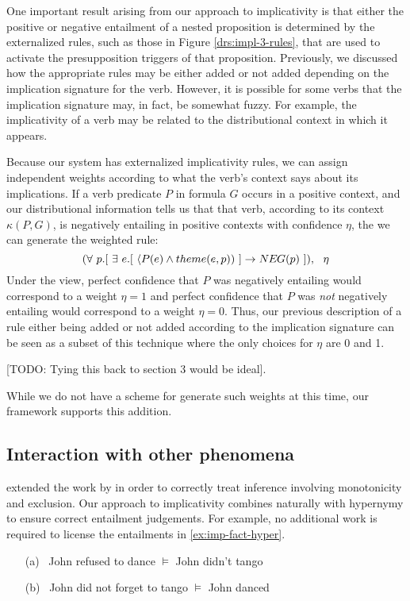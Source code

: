 One important result arising from our approach to implicativity is that
either the positive or negative entailment of a nested proposition is determined
by the externalized rules, such as those in Figure \ref{drs:impl-3-rules}, that
are used to activate the presupposition triggers of that proposition. 
Previously, we discussed how the appropriate rules may be either added or not
added depending on the implication signature for the verb.  However, it is
possible for some verbs that the implication signature may, in fact, be somewhat
fuzzy.  For example, the implicativity of a verb may be related to the
distributional context in which it appears.  

Because our system has externalized implicativity rules, we can assign
independent weights according to what the verb's context says about its
implications.  If a verb predicate $P$ in formula $G$ occurs in a positive
context, and our distributional information tells us that that verb, according
to its context $\kappa(P,G)$, is negatively entailing in positive contexts with
confidence $\eta$, the we can generate the weighted rule:
\[ (\forall~ p.[~ \exists~ e.[~ \langle P(e) \land theme(e,p)) ~] \to \NEG{p}
~]),~~\eta \]
Under the view, perfect confidence that  $P$ was negatively entailing would
correspond to a weight $\eta=1$ and perfect confidence that $P$ was {\it not}
negatively entailing would correspond to a weight $\eta=0$.  Thus, our previous
description of a rule either being added or not added according to the
implication signature can be seen as a subset of this technique where the only
choices for $\eta$ are 0 and 1.

[TODO: Tying this back to section 3 would be ideal].

While we do not have a scheme for generate such weights at this time, our
framework supports this addition.


\subsection*{Interaction with other phenomena}


\citet{maccartney:iwcs2009} extended the work by \citet{nairn:icos2006} in order
to correctly treat inference involving monotonicity and exclusion.
Our approach to implicativity combines naturally with hypernymy to ensure
correct entailment judgements. For example, no additional work is required to
license the entailments in \eqref{ex:imp-fact-hyper}.
\begin{covex}\label{ex:imp-fact-hyper}
\begin{itemize}
  \item[(a)]~John refused to dance $\vDash$ John didn't tango
  \item[(b)]~John did not forget to tango $\vDash$ John danced
\end{itemize}
\end{covex}

